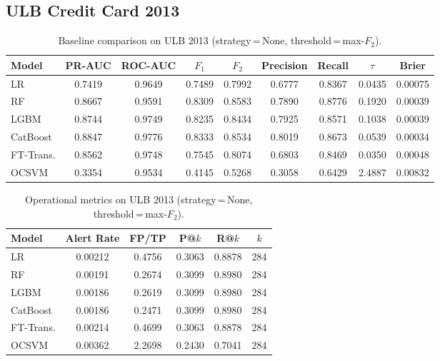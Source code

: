 
\subsection{ULB Credit Card 2013}

\begin{table}[ht!]
\centering
\caption{Baseline comparison on ULB 2013 (strategy\,=\,None, threshold\,=\,max-$F_2$).}
\label{tab:baseline_ulb}
\begin{tabular}{l c c c c c c c c}
\toprule
Model & PR-AUC & ROC-AUC & $F_1$ & $F_2$ & Precision & Recall & $\tau$ & Brier \\
\midrule
LR         & 0.7419 & 0.9649 & 0.7489 & 0.7992 & 0.6777 & 0.8367 & 0.0435 & 0.00075 \\
RF         & 0.8667 & 0.9591 & 0.8309 & 0.8583 & 0.7890 & 0.8776 & 0.1920 & 0.00039 \\
LGBM       & 0.8744 & 0.9749 & 0.8235 & 0.8434 & 0.7925 & 0.8571 & 0.1038 & 0.00039 \\
CatBoost   & 0.8847 & 0.9776 & 0.8333 & 0.8534 & 0.8019 & 0.8673 & 0.0539 & 0.00034 \\
FT-Trans.  & 0.8562 & 0.9748 & 0.7545 & 0.8074 & 0.6803 & 0.8469 & 0.0350 & 0.00048 \\
OCSVM      & 0.3354 & 0.9534 & 0.4145 & 0.5268 & 0.3058 & 0.6429 & 2.4887 & 0.00832 \\
\bottomrule
\end{tabular}
\end{table}

\begin{table}[ht!]
\centering
\caption{Operational metrics on ULB 2013 (strategy\,=\,None, threshold\,=\,max-$F_2$).}
\label{tab:ops_ulb}
\begin{tabular}{l c c c c c}
\toprule
Model & Alert Rate & FP/TP & P@$k$ & R@$k$ & $k$ \\
\midrule
LR         & 0.00212 & 0.4756 & 0.3063 & 0.8878 & 284 \\
RF         & 0.00191 & 0.2674 & 0.3099 & 0.8980 & 284 \\
LGBM       & 0.00186 & 0.2619 & 0.3099 & 0.8980 & 284 \\
CatBoost   & 0.00186 & 0.2471 & 0.3099 & 0.8980 & 284 \\
FT-Trans.  & 0.00214 & 0.4699 & 0.3063 & 0.8878 & 284 \\
OCSVM      & 0.00362 & 2.2698 & 0.2430 & 0.7041 & 284 \\
\bottomrule
\end{tabular}
\end{table}

